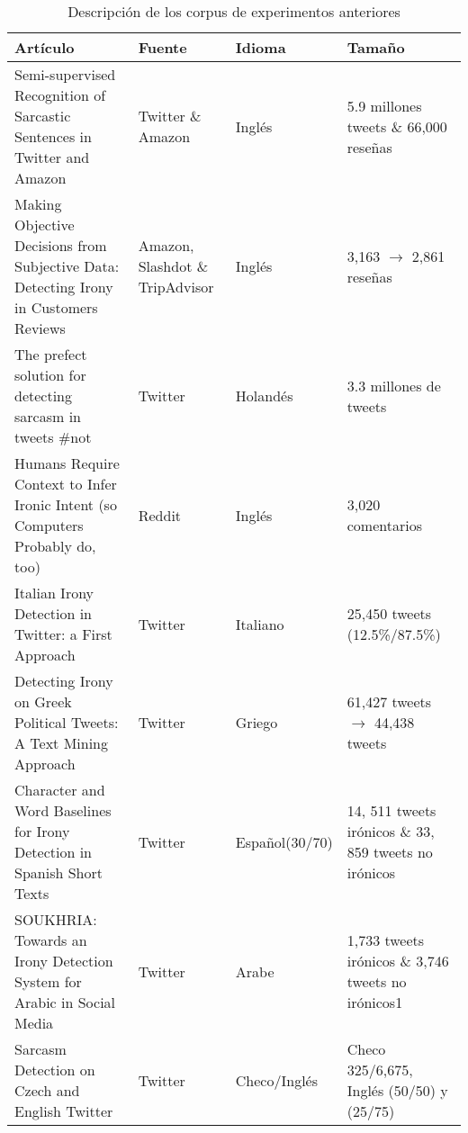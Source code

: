 \begin{table}[]
	\begin{tabular}{|p{5cm}p{2cm}lp{3cm}|}
		\hline
		\multicolumn{1}{|l|}{Artículo}                                                                               & \multicolumn{1}{l|}{Fuente}     & \multicolumn{1}{l|}{Idioma} & Tamaño                                                \\ \hline
		\hline
		Semi-supervised Recognition of Sarcastic Sentences in Twitter and Amazon \cite{davidov2010semi}              & Twitter \& Amazon               & Inglés                      & 5.9 millones tweets \& 66,000 reseñas                 \\ \hline
		Making Objective Decisions from Subjective Data: Detecting Irony in Customers Reviews \cite{reyes2012making} & Amazon, Slashdot \& TripAdvisor & Inglés                      & 3,163 $\rightarrow$ 2,861 reseñas                     \\ \hline
		The prefect solution for detecting sarcasm in tweets \#not \cite{liebrecht2013perfect}                       & Twitter                         & Holandés                    & 3.3 millones de tweets                                \\ \hline
		Humans Require Context to Infer Ironic Intent (so Computers Probably do, too) \cite{wallace2014humans}       & Reddit                          & Inglés                      & 3,020 comentarios                                     \\ \hline
		Italian Irony Detection in Twitter: a First Approach \cite{barbieri2014italian}                              & Twitter                         & Italiano                    & 25,450 tweets (12.5\%/87.5\%)                         \\ \hline
		Detecting Irony on Greek Political Tweets: A Text Mining Approach \cite{charalampakis2015detecting}          & Twitter                         & Griego                      & 61,427 tweets $\rightarrow$ 44,438 tweets             \\ \hline
		Character and Word Baselines for Irony Detection in Spanish Short Texts \cite{lopez2016character}            & Twitter                         & Español(30/70)              & 14, 511 tweets irónicos \& 33, 859 tweets no irónicos \\ \hline
		SOUKHRIA: Towards an Irony Detection System for Arabic in Social Media \cite{karoui2017soukhria}             & Twitter                         & Arabe                       & 1,733 tweets irónicos \& 3,746 tweets no irónicos1    \\ \hline
		Sarcasm Detection on Czech and English Twitter \cite{ptavcek2014sarcasm}                                     & Twitter                         & Checo/Inglés                & Checo 325/6,675, Inglés (50/50) y (25/75)             \\ \hline
	\end{tabular}
	\caption{Descripción de los corpus de experimentos anteriores}
	\label{tab:corpuses}
\end{table}
